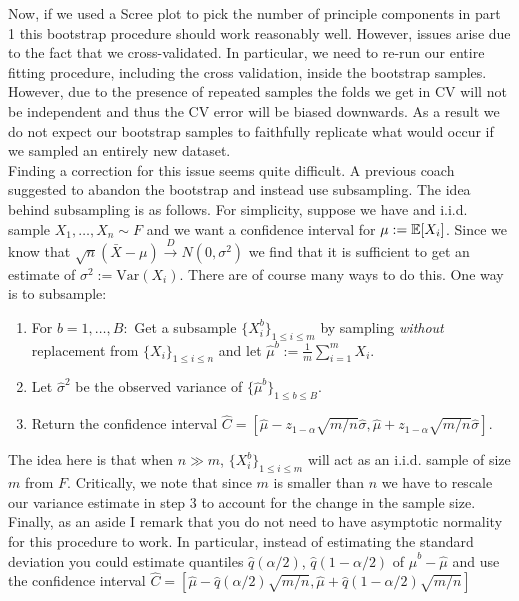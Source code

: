 \begin{enumerate}
Now, if we used a Scree plot to pick the number of principle components in part 1 this bootstrap procedure should work reasonably well. However, issues arise due to the fact that we cross-validated. In particular, we need to re-run our entire fitting procedure, including the cross validation, inside the bootstrap samples. However, due to the presence of repeated samples the folds we get in CV will not be independent and thus the CV error will be biased downwards. As a result we do not expect our bootstrap samples to faithfully replicate what would occur if we sampled an entirely new dataset.\\

Finding a correction for this issue seems quite difficult. A previous coach suggested to abandon the bootstrap and instead use subsampling. The idea behind subsampling is as follows. For simplicity, suppose we have and i.i.d. sample $X_1,\dots,X_n \sim F$ and we want a confidence interval for $\mu := \mathbb{E}[X_i]$. Since we know that $\sqrt{n}(\bar{X} - \mu) \stackrel{D}{\to} N(0,\sigma^2)$ we find that it is sufficient to get an estimate of $\sigma^2 := \text{Var}(X_i)$. There are of course many ways to do this. One way is to subsample:
\begin{enumerate}
\item
For $b = 1,\dots,B:$ Get a subsample $\{X^b_i\}_{1 \leq i \leq m}$ by sampling \textit{without} replacement from $\{X_i\}_{1 \leq i \leq n}$ and let $\hat{\mu}^b := \frac{1}{m}\sum_{i=1}^m X_i$.
\item
Let $\hat{\sigma}^2$ be the observed variance of $\{ \hat{\mu}^b\}_{1 \leq b \leq B}$.
\item
Return the confidence interval $\hat{C} = [\hat{\mu} - z_{1-\alpha} \sqrt{m/n}\hat{\sigma},\hat{\mu} + z_{1-\alpha} \sqrt{m/n} \hat{\sigma}]$.
\end{enumerate}
The idea here is that when $n \gg m$, $ \{X^b_i\}_{1 \leq i \leq m}$ will act as an i.i.d. sample of size $m$ from $F$. Critically, we note that since $m$ is smaller than $n$ we have to rescale our variance estimate in step 3 to account for the change in the sample size. Finally, as an aside I remark that you do not need to have asymptotic normality for this procedure to work. In particular, instead of estimating the standard deviation you could estimate quantiles $\hat{q}(\alpha/2)$, $\hat{q}(1-\alpha/2)$ of $\hat{\mu}^b - \hat{\mu}$ and use the confidence interval $\hat{C} = [\hat{\mu} - \hat{q}(\alpha/2) \sqrt{m/n},\hat{\mu} + \hat{q}(1-\alpha/2)\sqrt{m/n} ]$     \\


\end{enumerate}
